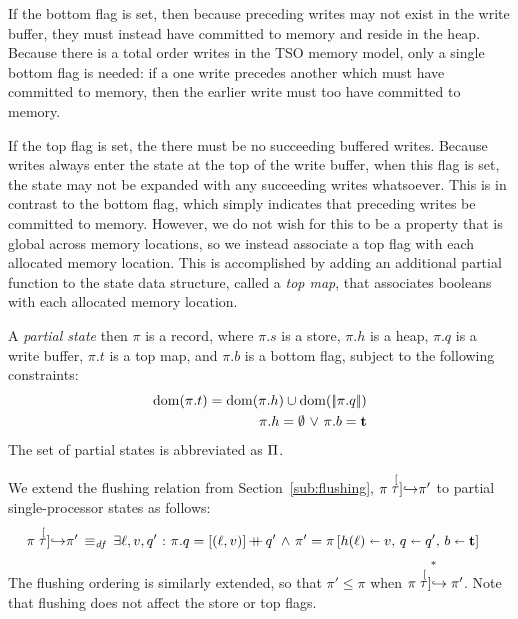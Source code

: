 \documentclass[11pt]{report}
\begin{document}
If the bottom flag is set, then because preceding writes may not exist in the write buffer, they must instead have committed to memory and reside in the heap. Because there is a total order writes in the TSO memory model, only a single bottom flag is needed: if a one write precedes another which must have committed to memory, then the earlier write must too have committed to memory. 

If the top flag is set, the there must be no succeeding buffered writes. Because writes always enter the state at the top of the write buffer, when this flag is set, the state may not be expanded with any succeeding writes whatsoever. This is in contrast to the bottom flag, which simply indicates that preceding writes be committed to memory. However, we do not wish for this to be a property that is global across memory locations, so we instead associate a top flag with each allocated memory location. This is accomplished by adding an additional partial function to the state data structure, called a \emph{top map}, that associates booleans with each allocated memory location. %

A \emph{partial state} then $\pi$ is a record, where $\pi.s$ is a store, $\pi.h$ is a heap, $\pi.q$ is a write buffer, $\pi.t$ is a top map, and $\pi.b$ is a bottom flag, subject to the following constraints: \begin{align}
	\operatorname{\mathrm{dom}}(\pi.t) = \operatorname{\mathrm{dom}}(\pi.h) \cup \operatorname{\mathrm{dom}}(|\!|\pi.q|\!|) \\
	\pi.h = \operatorname{\emptyset} \operatorname{\,\vee\,} \pi.b = \mathbf{t}
\end{align} The set of partial states is abbreviated as $\Pi$.

We extend the flushing relation from Section~\ref{sub:flushing}, $\pi \stackrel[\tau]{}{\operatorname{\hookrightarrow}} \pi'$ to partial single-processor states as follows:  \begin{equation}
\begin{split}
	\label{eq:ptaustep}
	\pi \stackrel[\tau]{}{\operatorname{\hookrightarrow}} \pi' \operatorname{\;\equiv_{\mathit{df}}\;} {} & \exists \ell, v, q' \operatorname{\,:\,} \pi.q = \left[(\ell,v)\right]\operatorname{+\!\!\!+} q' \operatorname{\,\wedge\,} \pi' = \pi \left[ h(\ell) \shortleftarrow v,\,q \shortleftarrow q',\,b \shortleftarrow \mathbf{t} \right]
\end{split}
\end{equation} The flushing ordering is similarly extended, so that $\pi' \leq \pi$ when $\pi \stackrel{\ast}{\stackrel[\tau]{}{\operatorname{\hookrightarrow}}} \pi'$. Note that flushing does not affect the store or top flags. 
\end{document}
